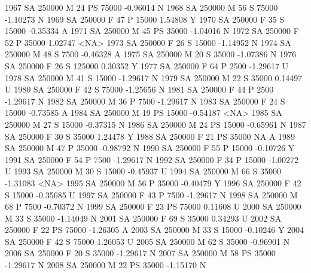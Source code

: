 \documentclass{article}
\begin{document}
\begin{Schunk}
\begin{Soutput}
1967     SA     250000   M  24        PS  75000  -0.96014    N
1968     SA     250000   M  56         S  75000  -1.10273    N
1969     SA     250000   F  47         P  15000   1.54808    Y
1970     SA     250000   F  35         S  15000  -0.35334    A
1971     SA     250000   M  45        PS  35000  -1.04016    N
1972     SA     250000   F  52         P  35000   1.02747 <NA>
1973     SA     250000   F  26         S  15000  -1.14952    N
1974     SA     250000   M  48         S   7500  -0.46328    A
1975     SA     250000   M  20         S  35000  -1.07386    N
1976     SA     250000   F  26         S 125000   0.30352    Y
1977     SA     250000   F  64         P   2500  -1.29617    U
1978     SA     250000   M  41         S  15000  -1.29617    N
1979     SA     250000   M  22         S  35000   0.14497    U
1980     SA     250000   F  42         S  75000  -1.25656    N
1981     SA     250000   F  44         P   2500  -1.29617    N
1982     SA     250000   M  36         P   7500  -1.29617    N
1983     SA     250000   F  24         S  15000  -0.73585    A
1984     SA     250000   M  19        PS  15000  -0.54187 <NA>
1985     SA     250000   M  27         S  15000  -0.37315    N
1986     SA     250000   M  24        PS  15000  -0.65961    N
1987     SA     250000   F  30         S  35000   1.24478    Y
1988     SA     250000   F  21        PS  35000        NA    A
1989     SA     250000   M  47         P  35000  -0.98792    N
1990     SA     250000   F  55         P  15000  -0.10726    Y
1991     SA     250000   F  54         P   7500  -1.29617    N
1992     SA     250000   F  34         P  15000  -1.00272    U
1993     SA     250000   M  30         S  15000  -0.45937    U
1994     SA     250000   M  66         S  35000  -1.31083 <NA>
1995     SA     250000   M  56         P  35000  -0.40479    Y
1996     SA     250000   F  42         S  15000  -0.35685    U
1997     SA     250000   F  43         P   7500  -1.29617    N
1998     SA     250000   M  68         P   7500  -0.70372    N
1999     SA     250000   F  23        PS  75000   0.11608    U
2000     SA     250000   M  33         S  35000  -1.14049    N
2001     SA     250000   F  69         S  35000   0.34293    U
2002     SA     250000   F  22        PS  75000  -1.26305    A
2003     SA     250000   M  33         S  15000  -0.10246    Y
2004     SA     250000   F  42         S  75000   1.26053    U
2005     SA     250000   M  62         S  35000  -0.96901    N
2006     SA     250000   F  20         S  35000  -1.29617    N
2007     SA     250000   M  58        PS  35000  -1.29617    N
2008     SA     250000   M  22        PS  35000  -1.15170    N

\end{Soutput}
\end{Schunk}
\end{document}
